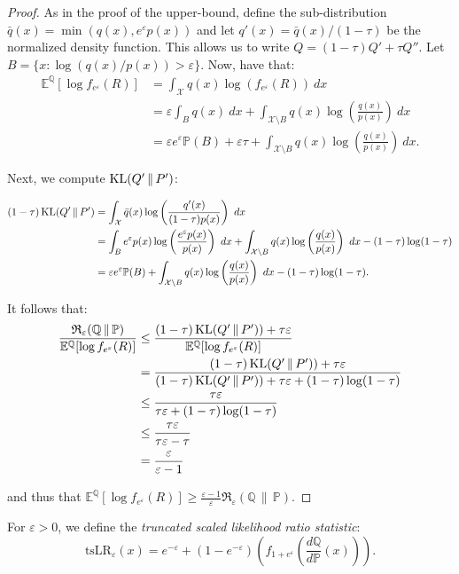 \documentclass{article}
\DeclareMathOperator{\KLop}{KL}
\newcommand{\KL}[2]{%
  \mathchoice
    {\KLop\!\left(#1\,\middle\|\,#2\right)}%
    {\KLop(#1\,\Vert\,#2)}%
    {\KLop(#1\,\Vert\,#2)}%
    {\KLop(#1\,\Vert\,#2)}%
}
\newcommand{\Rdiv}[3][\eps]{%
  \mathfrak{R}_{#1}\!\left(#2\,\middle\|\,#3\right)%
}
\newcommand{\Null}{\mathbb{P}}
\newcommand{\E}{\mathbb{E}}
\newcommand{\Alt}{\mathbb{Q}}
\newcommand{\opt}{\Rdiv{\Alt}{\Null}}
\newcommand{\tsllr}{\text{tsLR}}
\newcommand{\eps}{\varepsilon}
\begin{document}
\begin{proof}
As in the proof of the upper-bound, define the sub-distribution $\bar q(x) = \min(q(x), e^\varepsilon p(x))$ and let $q'(x) = \bar q(x)/(1-\tau)$ be the normalized density function. This allows us to write $Q = (1-\tau)Q' + \tau Q''$. Let $B = \lbrace x: \log(q(x)/p(x)) > \varepsilon \rbrace$. Now, have that:
\begin{align*}
    \E^\Alt[\log f_{e^\varepsilon}(R)] &= \int_\mathcal{X} q(x) \log(f_{e^\varepsilon}(R))~dx \\
    &= \varepsilon \int_B q(x)~dx + \int_{\mathcal{X} \setminus B} q(x) \log \left( \frac{q(x)}{p(x)} \right)~dx \\
    &= \varepsilon e^\varepsilon \Null(B) + \varepsilon \tau + \int_{\mathcal{X} \setminus B} q(x) \log \left( \frac{q(x)}{p(x)} \right)~dx.
\end{align*}

Next, we compute $\KL{Q'}{P'}$:

\begin{align*}
    (1-\tau)\KL{Q'}{P'}
    &= \int_\mathcal{X} \bar q(x) \log\left( \frac{q'(x)}{(1-\tau)p(x)} \right) ~dx \\
    &= \int_B e^\varepsilon p(x) \log\left( \frac{e^\varepsilon p(x)}{ p(x)} \right) ~dx + \int_{\mathcal{X} \setminus B} q(x) \log\left( \frac{q(x)}{p(x)} \right) ~dx - (1-\tau)\log(1-\tau)\\
    &= \varepsilon e^\varepsilon \Null(B) + \int_{\mathcal{X} \setminus B} q(x) \log\left( \frac{q(x)}{p(x)} \right) ~dx - (1-\tau)\log(1-\tau).
\end{align*}

It follows that:
\begin{align*}
    \frac{\opt}{\E^\Alt[\log f_{e^\eps}(R)]} 
    &\leq \frac{(1-\tau) \KL{Q'}{P'}) + \tau\varepsilon}{\E^\Alt[\log f_{e^\eps}(R)]} \\
    &= \frac{(1-\tau) \KL{Q'}{P'}) + \tau\varepsilon}{(1-\tau) \KL{Q'}{P'}) + \tau\varepsilon + (1-\tau)\log(1-\tau)} \\
    &\leq \frac{\tau\varepsilon}{\tau\varepsilon + (1-\tau)\log(1-\tau)} \\
    &\leq \frac{\tau \eps}{\tau\eps - \tau} \\
    &= \frac{\eps}{\eps-1}
\end{align*}

and thus that $\E^\Alt[\log f_{e^\eps}(R)] \geq \frac{\eps-1}{\eps}\opt$.
\end{proof}

For $\varepsilon>0$, we define the \emph{truncated scaled likelihood ratio statistic}:
\begin{equation*}
    \tsllr_\varepsilon(x) = e^{-\varepsilon} + (1-e^{-\varepsilon})\left( f_{1+e^\varepsilon}\left(\frac{d\Alt}{d\Null}(x)\right) \right).
\end{equation*}
\end{document}
